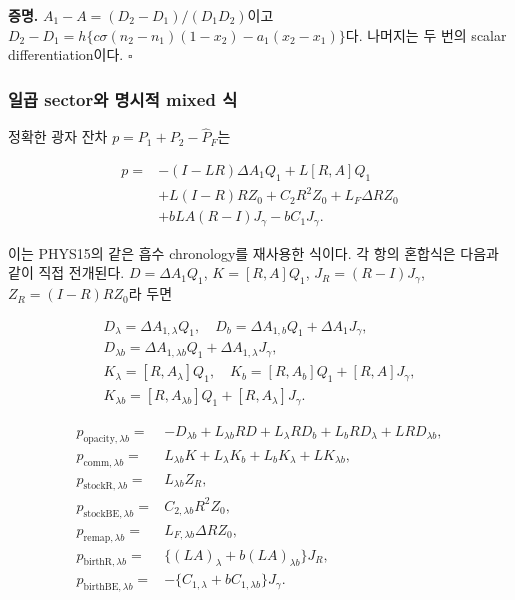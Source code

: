 \textbf{증명.} \(A_1-A=(D_2-D_1)/(D_1D_2)\)이고
\(D_2-D_1=h\{c\sigma(n_2-n_1)(1-x_2)-a_1(x_2-x_1)\}\)다. 나머지는 두
번의 scalar differentiation이다. \(\square\)

\hypertarget{uxc77cuxacf1-sectoruxc640-uxba85uxc2dcuxc801-mixed-uxc2dd}{%
\subsubsection{일곱 sector와 명시적 mixed
식}\label{uxc77cuxacf1-sectoruxc640-uxba85uxc2dcuxc801-mixed-uxc2dd}}

정확한 광자 잔차 \(p=P_1+P_2-\widehat P_F\)는

\[
\boxed{\begin{aligned}
p={}&-(I-LR)\Delta A_1Q_1+L[R,A]Q_1\\
&+L(I-R)RZ_0+C_2R^2Z_0+L_F\Delta R Z_0\\
&+bLA(R-I)J_\gamma-bC_1J_\gamma.
\end{aligned}}
\tag{18.38}
\]

이는 PHYS15의 같은 흡수 chronology를 재사용한 식이다. 각 항의 혼합식은
다음과 같이 직접 전개된다. \(D=\Delta A_1Q_1\), \(K=[R,A]Q_1\),
\(J_R=(R-I)J_\gamma\), \(Z_R=(I-R)RZ_0\)라 두면

\[
\begin{gathered}
D_\lambda=\Delta A_{1,\lambda}Q_1,\quad
D_b=\Delta A_{1,b}Q_1+\Delta A_1J_\gamma,\\
D_{\lambda b}=\Delta A_{1,\lambda b}Q_1
+\Delta A_{1,\lambda}J_\gamma,\\
K_\lambda=[R,A_\lambda]Q_1,\quad
K_b=[R,A_b]Q_1+[R,A]J_\gamma,\\
K_{\lambda b}=[R,A_{\lambda b}]Q_1+[R,A_\lambda]J_\gamma.
\end{gathered}
\tag{18.39}
\]

\[
\begin{aligned}
p_{\mathrm{opacity},\lambda b}
={}&-D_{\lambda b}+L_{\lambda b}RD
+L_\lambda RD_b+L_bRD_\lambda+LRD_{\lambda b},\\
p_{\mathrm{comm},\lambda b}
={}&L_{\lambda b}K+L_\lambda K_b+L_bK_\lambda+LK_{\lambda b},\\
p_{\mathrm{stockR},\lambda b}
={}&L_{\lambda b}Z_R,\\
p_{\mathrm{stockBE},\lambda b}
={}&C_{2,\lambda b}R^2Z_0,\\
p_{\mathrm{remap},\lambda b}
={}&L_{F,\lambda b}\Delta RZ_0,\\
p_{\mathrm{birthR},\lambda b}
={}&\{(LA)_\lambda+b(LA)_{\lambda b}\}J_R,\\
p_{\mathrm{birthBE},\lambda b}
={}&-\{C_{1,\lambda}+bC_{1,\lambda b}\}J_\gamma.
\end{aligned}
\tag{18.40}
\]

